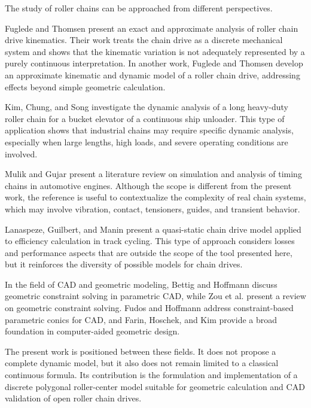 \documentclass[12pt,a4paper]{article}
\begin{document}
The study of roller chains can be approached from different perspectives.

Fuglede and Thomsen \cite{fuglede2016mmt} present an exact and approximate analysis of roller chain drive kinematics. Their work treats the chain drive as a discrete mechanical system and shows that the kinematic variation is not adequately represented by a purely continuous interpretation. In another work, Fuglede and Thomsen \cite{fuglede2016jsv} develop an approximate kinematic and dynamic model of a roller chain drive, addressing effects beyond simple geometric calculation.

Kim, Chung, and Song \cite{kim2017} investigate the dynamic analysis of a long heavy-duty roller chain for a bucket elevator of a continuous ship unloader. This type of application shows that industrial chains may require specific dynamic analysis, especially when large lengths, high loads, and severe operating conditions are involved.

Mulik and Gujar \cite{mulik2016} present a literature review on simulation and analysis of timing chains in automotive engines. Although the scope is different from the present work, the reference is useful to contextualize the complexity of real chain systems, which may involve vibration, contact, tensioners, guides, and transient behavior.

Lanaspeze, Guilbert, and Manin \cite{lanaspeze2024} present a quasi-static chain drive model applied to efficiency calculation in track cycling. This type of approach considers losses and performance aspects that are outside the scope of the tool presented here, but it reinforces the diversity of possible models for chain drives.

In the field of CAD and geometric modeling, Bettig and Hoffmann \cite{bettig2011} discuss geometric constraint solving in parametric CAD, while Zou et al. \cite{zou2022} present a review on geometric constraint solving. Fudos and Hoffmann \cite{fudos1996} address constraint-based parametric conics for CAD, and Farin, Hoschek, and Kim \cite{farin2002} provide a broad foundation in computer-aided geometric design.

The present work is positioned between these fields. It does not propose a complete dynamic model, but it also does not remain limited to a classical continuous formula. Its contribution is the formulation and implementation of a discrete polygonal roller-center model suitable for geometric calculation and CAD validation of open roller chain drives.
\end{document}
